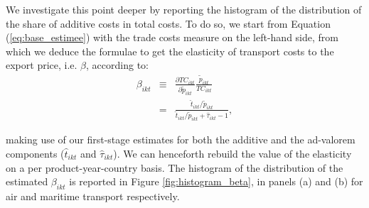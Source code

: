 \documentclass[a4paper,11pt]{article}
\begin{document}
We investigate this point deeper by reporting the histogram of the distribution of the share of additive costs in total costs. To do so, we start from Equation (\ref{eq:base_estimee}) with the trade costs measure on the left-hand side, from which we deduce the formulae to get the elasticity of transport costs to the export price, i.e. $\beta$, according to:
\begin{eqnarray*}
\beta_{ikt} &\equiv& \frac{\partial TC_{ikt}}{\partial \widetilde{p}_{ikt}}\frac{\widetilde{p}_{ikt}}{TC_{ikt}} \\
&=& \frac{\widehat{t}_{ikt}/\widetilde{p}_{ikt}}{\widehat{t}_{ikt}/\widetilde{p}_{ikt}+\widehat{\tau}_{ikt}-1},
\end{eqnarray*}

\noindent making use of our first-stage estimates for both the additive and the ad-valorem components ($\widehat{t}_{ikt}$ and $\widehat{\tau}_{ikt}$). We can henceforth rebuild the value of the elasticity on a per product-year-country basis. The histogram of the distribution of the estimated $\beta_{ikt}$ is reported in Figure \ref{fig:histogram_beta}, in panels (a) and (b) for air and maritime transport respectively.
\end{document}
